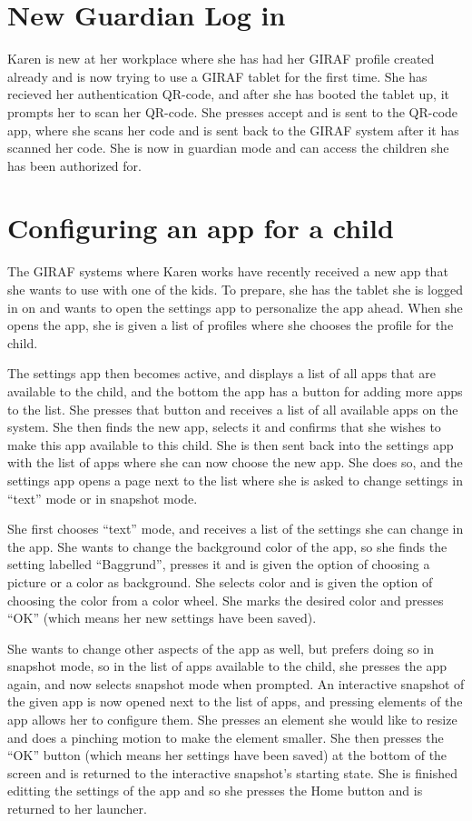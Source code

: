 \section{New Guardian Log in}
Karen is new at her workplace where she has had her GIRAF profile created already and is now trying to use a GIRAF tablet for the first time. 
She has recieved her authentication QR-code, and after she has booted the tablet up, it prompts her to scan her QR-code. 
She presses accept and is sent to the QR-code app, where she scans her code and is sent back to the GIRAF system after it has scanned her code. 
She is now in guardian mode and can access the children she has been authorized for.

\section{Configuring an app for a child}
The GIRAF systems where Karen works have recently received a new app that she wants to use with one of the kids. 
To prepare, she has the tablet she is logged in on and wants to open the settings app to personalize the app ahead. 
When she opens the app, she is given a list of profiles where she chooses the profile for the child. 

The settings app then becomes active, and displays a list of all apps that are available to the child, and the bottom the app has a button for adding more apps to the list. 
She presses that button and receives a list of all available apps on the system. 
She then finds the new app, selects it and confirms that she wishes to make this app available to this child.
She is then sent back into the settings app with the list of apps where she can now choose the new app. 
She does so, and the settings app opens a page next to the list where she is asked to change settings in ``text'' mode or in snapshot mode. 

She first chooses ``text'' mode, and receives a list of the settings she can change in the app. 
She wants to change the background color of the app, so she finds the setting labelled ``Baggrund'', presses it and is given the option of choosing a picture or a color as background. 
She selects color and is given the option of choosing the color from a color wheel. 
She marks the desired color and presses ``OK'' (which means her new settings have been saved). 

She wants to change other aspects of the app as well, but prefers doing so in snapshot mode, so in the list of apps available to the child, she presses the app again, and now selects snapshot mode when prompted.
An interactive snapshot of the given app is now opened next to the list of apps, and pressing elements of the app allows her to configure them. 
She presses an element she would like to resize and does a pinching motion to make the element smaller. 
She then presses the ``OK'' button (which means her settings have been saved) at the bottom of the screen and is returned to the interactive snapshot's starting state.
She is finished editting the settings of the app and so she presses the Home button and is returned to her launcher.

